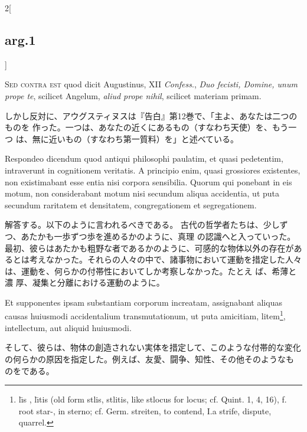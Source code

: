 \documentclass[paper=a4paper,fontsize=10pt,jafontsize=9pt,titlepage]{jlreq}
\begin{document}
\begin{paracol}{2}[\subsection{arg.1}]
\switchcolumn*[\subsection{s.c.}]

{\scshape Sed contra est} quod dicit Augustinus, XII {\itshape Confess}., {\itshape Duo fecisti,
 Domine, unum prope te}, scilicet Angelum, {\itshape aliud prope nihil}, scilicet
 materiam primam.

\switchcolumn

しかし反対に、アウグスティヌスは『告白』第12巻で、「主よ、あなたは二つのものを
 作った。一つは、あなたの近くにあるもの（すなわち天使）を、もう一つ
 は、無に近いもの（すなわち第一質料）を」と述べている。


Respondeo dicendum quod antiqui philosophi paulatim, et quasi
 pedetentim, intraverunt in cognitionem veritatis. A principio enim,
 quasi grossiores existentes, non existimabant esse entia nisi corpora
 sensibilia. Quorum qui ponebant in eis motum, non considerabant motum
 nisi secundum aliqua accidentia, ut puta secundum raritatem et
 densitatem, congregationem et segregationem.

\switchcolumn

解答する。以下のように言われるべきである。
古代の哲学者たちは、少しずつ、あたかも一歩ずつ歩を進めるかのように、真理
の認識へと入っていった。
最初、彼らはあたかも粗野な者であるかのように、可感的な物体以外の存在があ
るとは考えなかった。それらの人々の中で、諸事物において運動を措定した人々
 は、運動を、何らかの付帯性においてしか考察しなかった。たとえ ば、希薄と濃
 厚、凝集と分離における運動のように。

\switchcolumn*

Et supponentes ipsam
 substantiam corporum increatam, assignabant aliquas causas huiusmodi
 accidentalium transmutationum, ut puta amicitiam, litem\footnote
{
l\={\i}s , l\={\i}tis (old form stlis, stlitis, like stlocus for locus; cf. Quint. 1, 4, 16), f. root star-, in sterno; cf. Germ. streiten, to contend,
I.a strife, dispute, quarrel. 
}, intellectum,
 aut aliquid huiusmodi.

\switchcolumn

そして、彼らは、物体の創造されない実体を措定して、このような付帯的な変化
 の何らかの原因を指定した。例えば、友愛、闘争、知性、その他そのようなも
 のをである。


\end{paracol}
\end{document}
